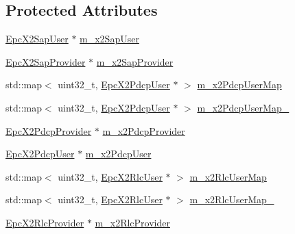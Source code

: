\subsection*{Protected Attributes}
\begin{DoxyCompactItemize}
\item 
\hyperlink{classns3_1_1EpcX2SapUser}{Epc\+X2\+Sap\+User} $\ast$ \hyperlink{classns3_1_1EpcX2_a0a74a3c19067fe18af3021c7b4c24c19}{m\+\_\+x2\+Sap\+User}
\item 
\hyperlink{classns3_1_1EpcX2SapProvider}{Epc\+X2\+Sap\+Provider} $\ast$ \hyperlink{classns3_1_1EpcX2_a0f18e63c998d9dc8771e80d325870fc2}{m\+\_\+x2\+Sap\+Provider}
\item 
std\+::map$<$ uint32\+\_\+t, \hyperlink{classns3_1_1EpcX2PdcpUser}{Epc\+X2\+Pdcp\+User} $\ast$ $>$ \hyperlink{classns3_1_1EpcX2_a0f79f52694f920d418c077441c73e2e6}{m\+\_\+x2\+Pdcp\+User\+Map}
\item 
std\+::map$<$ uint32\+\_\+t, \hyperlink{classns3_1_1EpcX2PdcpUser}{Epc\+X2\+Pdcp\+User} $\ast$ $>$ \hyperlink{classns3_1_1EpcX2_ab5cecb7cbdd0806ce336e52433751db1}{m\+\_\+x2\+Pdcp\+User\+Map\+\_}
\item 
\hyperlink{classns3_1_1EpcX2PdcpProvider}{Epc\+X2\+Pdcp\+Provider} $\ast$ \hyperlink{classns3_1_1EpcX2_a18e51cbbd2e384251d4f4bdebde0b23d}{m\+\_\+x2\+Pdcp\+Provider}
\item 
\hyperlink{classns3_1_1EpcX2PdcpUser}{Epc\+X2\+Pdcp\+User} $\ast$ \hyperlink{classns3_1_1EpcX2_a520ef9a6812a81c5d122833ccae05bfb}{m\+\_\+x2\+Pdcp\+User}
\item 
std\+::map$<$ uint32\+\_\+t, \hyperlink{classns3_1_1EpcX2RlcUser}{Epc\+X2\+Rlc\+User} $\ast$ $>$ \hyperlink{classns3_1_1EpcX2_a1fca08301d8d13f29a81d66250e34746}{m\+\_\+x2\+Rlc\+User\+Map}
\item 
std\+::map$<$ uint32\+\_\+t, \hyperlink{classns3_1_1EpcX2RlcUser}{Epc\+X2\+Rlc\+User} $\ast$ $>$ \hyperlink{classns3_1_1EpcX2_a71669e6a9be4d7640d05d8ff9fc21e62}{m\+\_\+x2\+Rlc\+User\+Map\+\_}
\item 
\hyperlink{classns3_1_1EpcX2RlcProvider}{Epc\+X2\+Rlc\+Provider} $\ast$ \hyperlink{classns3_1_1EpcX2_aa1bb6d6dbb18d9e41151177365109bf8}{m\+\_\+x2\+Rlc\+Provider}
\end{DoxyCompactItemize}

